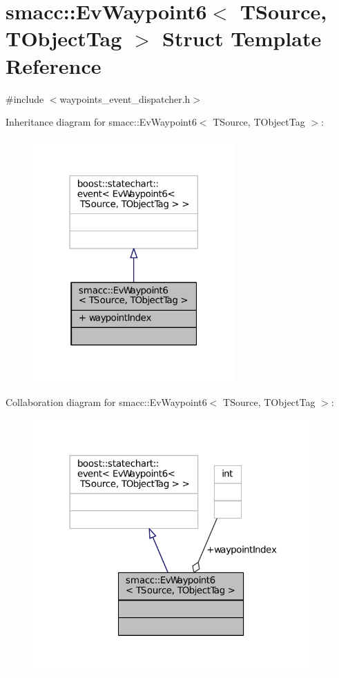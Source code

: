 \hypertarget{structsmacc_1_1EvWaypoint6}{}\section{smacc\+:\+:Ev\+Waypoint6$<$ T\+Source, T\+Object\+Tag $>$ Struct Template Reference}
\label{structsmacc_1_1EvWaypoint6}


{\ttfamily \#include $<$waypoints\+\_\+event\+\_\+dispatcher.\+h$>$}



Inheritance diagram for smacc\+:\+:Ev\+Waypoint6$<$ T\+Source, T\+Object\+Tag $>$\+:
\nopagebreak
\begin{figure}[H]
\begin{center}
\leavevmode
\includegraphics[width=219pt]{structsmacc_1_1EvWaypoint6__inherit__graph}
\end{center}
\end{figure}


Collaboration diagram for smacc\+:\+:Ev\+Waypoint6$<$ T\+Source, T\+Object\+Tag $>$\+:
\nopagebreak
\begin{figure}[H]
\begin{center}
\leavevmode
\includegraphics[width=305pt]{structsmacc_1_1EvWaypoint6__coll__graph}
\end{center}
\end{figure}
